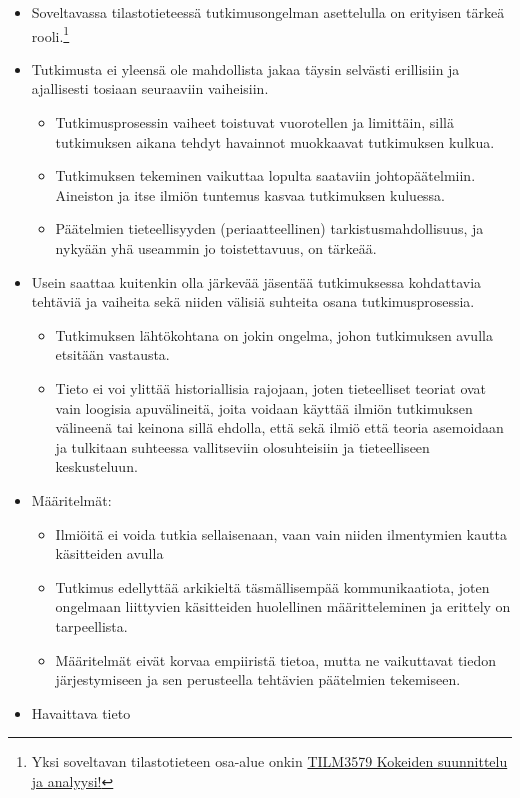 \documentclass[
]{book}
\providecommand{\tightlist}{%
  \setlength{\itemsep}{0pt}\setlength{\parskip}{0pt}}
\begin{document}
\begin{itemize}
\tightlist
\item
  Soveltavassa tilastotieteessä tutkimusongelman asettelulla on erityisen tärkeä rooli.\footnote{Yksi soveltavan tilastotieteen osa-alue onkin \href{https://opas.peppi.utu.fi/fi/opintojakso/TILM3579/5081}{TILM3579 Kokeiden suunnittelu ja analyysi!}}
\item
  Tutkimusta ei yleensä ole mahdollista jakaa täysin selvästi erillisiin ja ajallisesti tosiaan seuraaviin vaiheisiin.

  \begin{itemize}
  \tightlist
  \item
    Tutkimusprosessin vaiheet toistuvat vuorotellen ja limittäin, sillä tutkimuksen aikana tehdyt havainnot muokkaavat tutkimuksen kulkua.
  \item
    Tutkimuksen tekeminen vaikuttaa lopulta saataviin johtopäätelmiin. Aineiston ja itse ilmiön tuntemus kasvaa tutkimuksen kuluessa.
  \item
    Päätelmien tieteellisyyden (periaatteellinen) tarkistusmahdollisuus, ja nykyään yhä useammin jo toistettavuus, on tärkeää.
  \end{itemize}
\item
  Usein saattaa kuitenkin olla järkevää jäsentää tutkimuksessa kohdattavia tehtäviä ja vaiheita sekä niiden välisiä suhteita osana tutkimusprosessia.

  \begin{itemize}
  \tightlist
  \item
    Tutkimuksen lähtökohtana on jokin ongelma, johon tutkimuksen avulla etsitään vastausta.
  \item
    Tieto ei voi ylittää historiallisia rajojaan, joten tieteelliset teoriat ovat vain loogisia apuvälineitä, joita voidaan käyttää ilmiön tutkimuksen välineenä tai keinona sillä ehdolla, että sekä ilmiö että teoria asemoidaan ja tulkitaan suhteessa vallitseviin olosuhteisiin ja tieteelliseen keskusteluun.
  \end{itemize}
\item
  Määritelmät:

  \begin{itemize}
  \tightlist
  \item
    Ilmiöitä ei voida tutkia sellaisenaan, vaan vain niiden ilmentymien kautta käsitteiden avulla
  \item
    Tutkimus edellyttää arkikieltä täsmällisempää kommunikaatiota, joten ongelmaan liittyvien käsitteiden huolellinen määritteleminen ja erittely on tarpeellista.
  \item
    Määritelmät eivät korvaa empiiristä tietoa, mutta ne vaikuttavat tiedon järjestymiseen ja sen perusteella tehtävien päätelmien tekemiseen.
  \end{itemize}
\item
  Havaittava tieto


\end{itemize}
\end{document}
